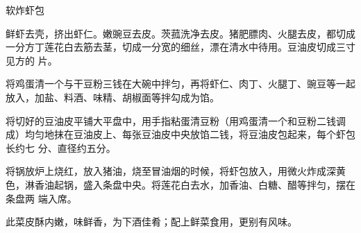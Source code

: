 %
%
%
%
%
%
%
\begin{recipe}{软炸虾包}

\ingredients


\preparation

\step 鲜虾去壳，挤出虾仁。嫩豌豆去皮。茨菰洗净去皮。猪肥膘肉、火腿去皮，都切成
一分方丁莲花白去筋去茎，切成一分宽的细丝，漂在清水中待用。豆油皮切成三寸见方的
片。

\step 将鸡蛋清一个与干豆粉三钱在大碗中拌匀，再将虾仁、肉丁、火腿丁、豌豆等一起
放入，加盐、料酒、味精、胡椒面等拌勾成为馅。

\step 将切好的豆油皮平铺大平盘中，用手指粘蛋清豆粉（用鸡蛋清一个和豆粉二钱调
成）均匀地抹在豆油皮上、每张豆油皮中央放馅二钱，将豆油皮包起来，每个虾包长约七
分、直径约五分。

\step 将锅放炉上烧红，放入猪油，烧至冒油烟的时候，将虾包放入，用微火炸成深黄
色，淋香油起锅，盛入条盘中央。将莲花白去水，加香油、白糖、醋等拌匀，摆在条盘两
端入席。

\features

此菜皮酥内嫩，味鲜香，为下酒佳肴；配上鲜菜食用，更别有风味。

\end{recipe}

